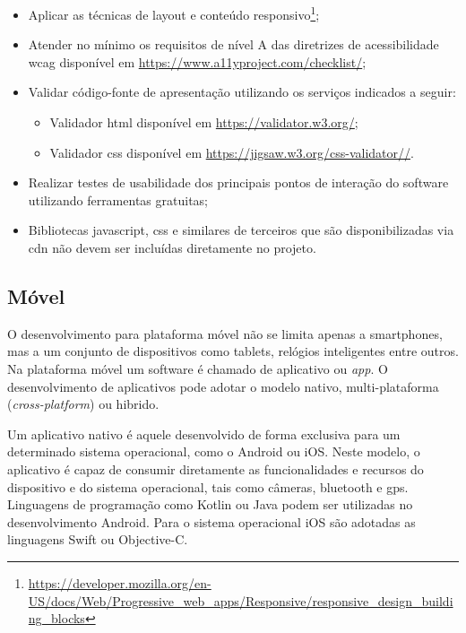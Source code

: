 \begin{itemize}
  \item Aplicar as técnicas de layout e conteúdo responsivo\footnote{\url{https://developer.mozilla.org/en-US/docs/Web/Progressive_web_apps/Responsive/responsive_design_building_blocks}};
  
  \item Atender no mínimo os requisitos de nível A das diretrizes de acessibilidade \ac{wcag} disponível em \url{https://www.a11yproject.com/checklist/};
  
  \item Validar código-fonte de apresentação utilizando os serviços indicados a seguir:
  \begin{itemize}
    \item Validador \ac{html} disponível em \url{https://validator.w3.org/};
    
    \item Validador \ac{css} disponível em \url{https://jigsaw.w3.org/css-validator//}.
  \end{itemize}
  
  \item Realizar testes de usabilidade dos principais pontos de interação do software utilizando ferramentas gratuitas; 
  
  \item Bibliotecas javascript, \ac{css} e similares de terceiros que são disponibilizadas via \ac{cdn} não devem ser incluídas diretamente no projeto.  

\end{itemize}

\subsection{Móvel}
O desenvolvimento para plataforma móvel não se limita apenas a smartphones, mas a um conjunto de dispositivos como tablets, relógios inteligentes entre outros. Na plataforma móvel um software é chamado de aplicativo ou \emph{app}. O desenvolvimento de aplicativos pode adotar o modelo nativo, multi-plataforma (\emph{cross-platform}) ou hibrido.

Um aplicativo nativo é aquele desenvolvido de forma exclusiva para um determinado sistema operacional, como o Android ou iOS. Neste modelo, o aplicativo é capaz de consumir diretamente as funcionalidades e recursos do dispositivo e do sistema operacional, tais como câmeras, bluetooth e \ac{gps}. Linguagens de programação como Kotlin ou Java podem ser utilizadas no desenvolvimento Android. Para o sistema operacional iOS são adotadas as linguagens Swift ou Objective-C.


